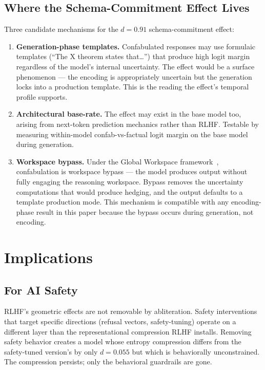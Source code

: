 \documentclass[11pt,a4paper]{article}
\begin{document}
\subsection{Where the Schema-Commitment Effect Lives}

Three candidate mechanisms for the $d{=}0.91$ schema-commitment
effect:

\begin{enumerate}[nosep]
\item \textbf{Generation-phase templates.} Confabulated responses
  may use formulaic templates (``The X theorem
  states that\ldots'') that produce high logit margin regardless
  of the model's internal uncertainty. The effect would be a
  surface phenomenon --- the encoding is appropriately uncertain
  but the generation locks into a production template. This is the
  reading the effect's temporal profile supports.
\item \textbf{Architectural base-rate.} The effect may
  exist in the base model too, arising from next-token prediction
  mechanics rather than RLHF. Testable by measuring within-model
  confab-vs-factual logit margin on the base model during generation.
\item \textbf{Workspace bypass.} Under the Global Workspace
  framework~\citep{gurnee2026gwt}, confabulation is workspace
  bypass --- the model produces output without fully engaging the
  reasoning workspace. Bypass removes the uncertainty computations
  that would produce hedging, and the output defaults to a
  template production mode. This mechanism is compatible with
  any encoding-phase result in this paper because the bypass occurs
  during generation, not encoding.
\end{enumerate}

\section{Implications}
\label{sec:implications}

\subsection{For AI Safety}

RLHF's geometric effects are not removable by abliteration. Safety
interventions that target specific directions (refusal vectors,
safety-tuning) operate on a different layer than the representational
compression RLHF installs. Removing safety behavior creates a model
whose entropy compression differs from the safety-tuned version's by
only $d{=}0.055$ but which is behaviorally unconstrained. The compression persists; only the
behavioral guardrails are gone.
\end{document}
